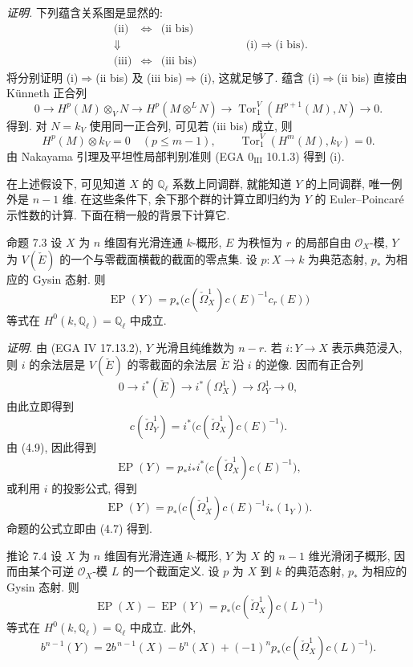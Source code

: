 \emph{证明.} 下列蕴含关系图是显然的:
\[
\begin{array}{ccc}
\text{(ii)}&\Leftrightarrow&\text{(ii bis)}\\
\Downarrow&&\\
\text{(iii)}&\Leftrightarrow&\text{(iii bis)}
\end{array}
\qquad\qquad
\text{(i)}\Rightarrow\text{(i bis).}
\]
将分别证明 (i)$\Rightarrow$(ii bis) 及 (iii bis)$\Rightarrow$(i), 这就足够了. 蕴含 (i)$\Rightarrow$(ii bis) 直接由 Künneth 正合列
\[
0\to H^p(M)\otimes_V N\to H^p(M\otimes^L N)\to \operatorname{Tor}_1^V(H^{p+1}(M),N)\to0.
\]
得到. 对 $N=k_V$ 使用同一正合列, 可见若 (iii bis) 成立, 则
\[
H^p(M)\otimes k_V=0\quad(p\le m-1),\qquad
\operatorname{Tor}_1^V(H^m(M),k_V)=0.
\]
由 Nakayama 引理及平坦性局部判别准则 (EGA $0_{\mathrm{III}}$ 10.1.3) 得到 (i).

在上述假设下, 可见知道 $X$ 的 $\mathbb Q_\ell$ 系数上同调群, 就能知道 $Y$ 的上同调群, 唯一例外是 $n-1$ 维. 在这些条件下, 余下那个群的计算立即归约为 $Y$ 的 Euler--Poincaré 示性数的计算. 下面在稍一般的背景下计算它.

\begin{statement}{命题 7.3}
设 $X$ 为 $n$ 维固有光滑连通 $k$-概形, $E$ 为秩恒为 $r$ 的局部自由 $\mathcal O_X$-模, $Y$ 为 $V(\check E)$ 的一个与零截面横截的截面的零点集. 设 $p:X\to k$ 为典范态射, $p_*$ 为相应的 Gysin 态射. 则
\[
\operatorname{EP}(Y)=p_*\bigl(c(\check\Omega_X^1)c(E)^{-1}c_r(E)\bigr)
\]
等式在 $H^0(k,\mathbb Q_\ell)=\mathbb Q_\ell$ 中成立.
\end{statement}

\emph{证明.} 由 (EGA IV 17.13.2), $Y$ 光滑且纯维数为 $n-r$. 若 $i:Y\to X$ 表示典范浸入, 则 $i$ 的余法层是 $V(\check E)$ 的零截面的余法层 $\check E$ 沿 $i$ 的逆像. 因而有正合列
\[
0\to i^*(\check E)\to i^*(\Omega_X^1)\to\Omega_Y^1\to0,
\tag{7.3.1}
\]
由此立即得到
\[
c(\check\Omega_Y^1)=i^*\bigl(c(\check\Omega_X^1)c(E)^{-1}\bigr).
\tag{7.3.2}
\]
由 (4.9), 因此得到
\[
\operatorname{EP}(Y)=p_*i_*i^*\bigl(c(\check\Omega_X^1)c(E)^{-1}\bigr),
\]
或利用 $i$ 的投影公式, 得到
\[
\operatorname{EP}(Y)=p_*\bigl(c(\check\Omega_X^1)c(E)^{-1}i_*(1_Y)\bigr).
\]
命题的公式立即由 (4.7) 得到.

\begin{statement}{推论 7.4}
设 $X$ 为 $n$ 维固有光滑连通 $k$-概形, $Y$ 为 $X$ 的 $n-1$ 维光滑闭子概形, 因而由某个可逆 $\mathcal O_X$-模 $L$ 的一个截面定义. 设 $p$ 为 $X$ 到 $k$ 的典范态射, $p_*$ 为相应的 Gysin 态射. 则
\[
\operatorname{EP}(X)-\operatorname{EP}(Y)=p_*\bigl(c(\check\Omega_X^1)c(L)^{-1}\bigr)
\tag{7.4.1}
\]
等式在 $H^0(k,\mathbb Q_\ell)=\mathbb Q_\ell$ 中成立. 此外,
\[
b^{n-1}(Y)=2b^{\,n-1}(X)-b^n(X)+(-1)^n p_*\bigl(c(\check\Omega_X^1)c(L)^{-1}\bigr).
\tag{7.4.2}
\]
\end{statement}

